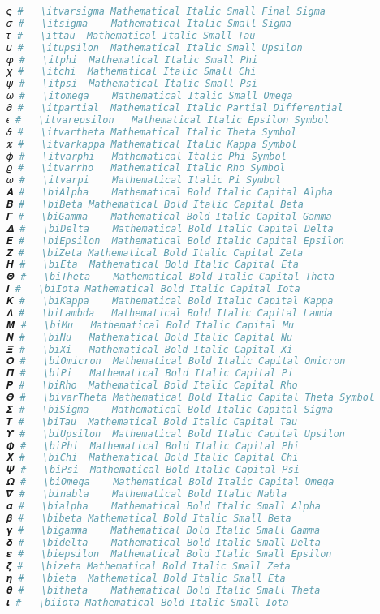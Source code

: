 \begin{lstlisting}[language=Julia, style=julia]
𝜍 #   \itvarsigma Mathematical Italic Small Final Sigma
𝜎 #   \itsigma    Mathematical Italic Small Sigma
𝜏 #   \ittau  Mathematical Italic Small Tau
𝜐 #   \itupsilon  Mathematical Italic Small Upsilon
𝜑 #   \itphi  Mathematical Italic Small Phi
𝜒 #   \itchi  Mathematical Italic Small Chi
𝜓 #   \itpsi  Mathematical Italic Small Psi
𝜔 #   \itomega    Mathematical Italic Small Omega
𝜕 #   \itpartial  Mathematical Italic Partial Differential
𝜖 #   \itvarepsilon   Mathematical Italic Epsilon Symbol
𝜗 #   \itvartheta Mathematical Italic Theta Symbol
𝜘 #   \itvarkappa Mathematical Italic Kappa Symbol
𝜙 #   \itvarphi   Mathematical Italic Phi Symbol
𝜚 #   \itvarrho   Mathematical Italic Rho Symbol
𝜛 #   \itvarpi    Mathematical Italic Pi Symbol
𝜜 #   \biAlpha    Mathematical Bold Italic Capital Alpha
𝜝 #   \biBeta Mathematical Bold Italic Capital Beta
𝜞 #   \biGamma    Mathematical Bold Italic Capital Gamma
𝜟 #   \biDelta    Mathematical Bold Italic Capital Delta
𝜠 #   \biEpsilon  Mathematical Bold Italic Capital Epsilon
𝜡 #   \biZeta Mathematical Bold Italic Capital Zeta
𝜢 #   \biEta  Mathematical Bold Italic Capital Eta
𝜣 #   \biTheta    Mathematical Bold Italic Capital Theta
𝜤 #   \biIota Mathematical Bold Italic Capital Iota
𝜥 #   \biKappa    Mathematical Bold Italic Capital Kappa
𝜦 #   \biLambda   Mathematical Bold Italic Capital Lamda
𝜧 #   \biMu   Mathematical Bold Italic Capital Mu
𝜨 #   \biNu   Mathematical Bold Italic Capital Nu
𝜩 #   \biXi   Mathematical Bold Italic Capital Xi
𝜪 #   \biOmicron  Mathematical Bold Italic Capital Omicron
𝜫 #   \biPi   Mathematical Bold Italic Capital Pi
𝜬 #   \biRho  Mathematical Bold Italic Capital Rho
𝜭 #   \bivarTheta Mathematical Bold Italic Capital Theta Symbol
𝜮 #   \biSigma    Mathematical Bold Italic Capital Sigma
𝜯 #   \biTau  Mathematical Bold Italic Capital Tau
𝜰 #   \biUpsilon  Mathematical Bold Italic Capital Upsilon
𝜱 #   \biPhi  Mathematical Bold Italic Capital Phi
𝜲 #   \biChi  Mathematical Bold Italic Capital Chi
𝜳 #   \biPsi  Mathematical Bold Italic Capital Psi
𝜴 #   \biOmega    Mathematical Bold Italic Capital Omega
𝜵 #   \binabla    Mathematical Bold Italic Nabla
𝜶 #   \bialpha    Mathematical Bold Italic Small Alpha
𝜷 #   \bibeta Mathematical Bold Italic Small Beta
𝜸 #   \bigamma    Mathematical Bold Italic Small Gamma
𝜹 #   \bidelta    Mathematical Bold Italic Small Delta
𝜺 #   \biepsilon  Mathematical Bold Italic Small Epsilon
𝜻 #   \bizeta Mathematical Bold Italic Small Zeta
𝜼 #   \bieta  Mathematical Bold Italic Small Eta
𝜽 #   \bitheta    Mathematical Bold Italic Small Theta
𝜾 #   \biiota Mathematical Bold Italic Small Iota

\end{lstlisting}
